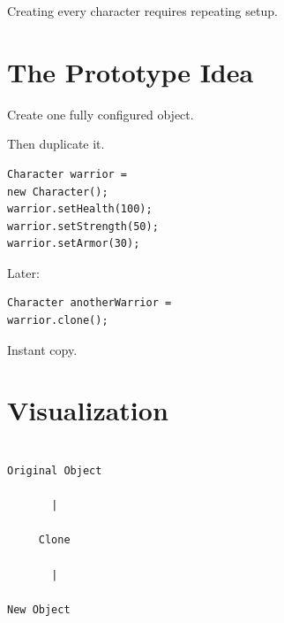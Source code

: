 \documentclass[11pt,a4paper]{book}
\begin{document}
Creating every character
requires repeating setup.


\section{The Prototype Idea}

Create one fully configured
object.


Then duplicate it.


\begin{verbatim}
Character warrior =
new Character();
warrior.setHealth(100);
warrior.setStrength(50);
warrior.setArmor(30);
\end{verbatim}


Later:

\begin{verbatim}
Character anotherWarrior =
warrior.clone();
\end{verbatim}


Instant copy.


\section{Visualization}

\begin{verbatim}

Original Object

       |

     Clone

       |

New Object

\end{verbatim}

\end{document}
